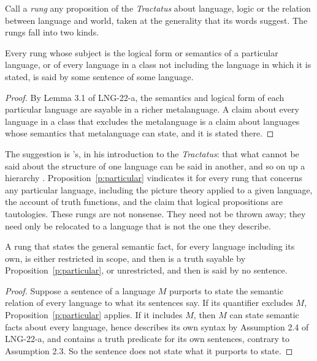 \documentclass{situationist-preprint}
\begin{document}
Call a \emph{rung} any proposition of the \emph{Tractatus} about language, logic or the relation between language and world, taken at the generality that its words suggest. The rungs fall into two kinds.

\begin{proposition}\label{p:particular}
Every rung whose subject is the logical form or semantics of a particular language, or of every language in a class not including the language in which it is stated, is said by some sentence of some language.
\end{proposition}

\begin{proof}
By Lemma 3.1 of LNG-22-a, the semantics and logical form of each particular language are sayable in a richer metalanguage. A claim about every language in a class that excludes the metalanguage is a claim about languages whose semantics that metalanguage can state, and it is stated there.
\end{proof}

The suggestion is \citeauthor{Russell1922}'s, in his introduction to the \emph{Tractatus}: that what cannot be said about the structure of one language can be said in another, and so on up a hierarchy \citep{Russell1922}. Proposition~\ref{p:particular} vindicates it for every rung that concerns any particular language, including the picture theory applied to a given language, the account of truth functions, and the claim that logical propositions are tautologies. These rungs are not nonsense. They need not be thrown away; they need only be relocated to a language that is not the one they describe.

\begin{proposition}\label{p:top}
A rung that states the general semantic fact, for every language including its own, is either restricted in scope, and then is a truth sayable by Proposition~\ref{p:particular}, or unrestricted, and then is said by no sentence.
\end{proposition}

\begin{proof}
Suppose a sentence of a language $M$ purports to state the semantic relation of every language to what its sentences say. If its quantifier excludes $M$, Proposition~\ref{p:particular} applies. If it includes $M$, then $M$ can state semantic facts about every language, hence describes its own syntax by Assumption 2.4 of LNG-22-a, and contains a truth predicate for its own sentences, contrary to Assumption 2.3. So the sentence does not state what it purports to state.
\end{proof}
\end{document}
